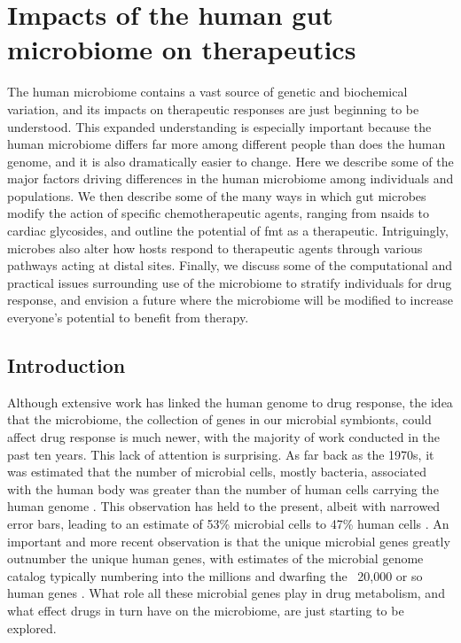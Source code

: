 \glsresetall

\section{Impacts of the human gut microbiome on 
therapeutics}\label{section_review}

The human microbiome contains a vast source of genetic and biochemical variation, and its impacts on therapeutic responses are just beginning to be understood. This expanded understanding is especially important because the human microbiome differs far more among different people than does the human genome, and it is also dramatically easier to change. Here we describe some of the major factors driving differences in the human microbiome among individuals and populations. We then describe some of the many ways in which gut microbes modify the action of specific chemotherapeutic agents, ranging from \glspl{nsaid} to cardiac glycosides, and outline the potential of \gls{fmt} as a therapeutic. Intriguingly, microbes also alter how hosts respond to therapeutic agents through various pathways acting at distal sites. Finally, we discuss some of the computational and practical issues surrounding use of the microbiome to stratify individuals for drug response, and envision a future where the microbiome will be modified to increase everyone's potential to benefit from therapy.

\subsection{Introduction}

Although extensive work has linked the human genome to drug response, the idea that the microbiome, the collection of genes in our microbial symbionts, could affect drug response is much newer, with the majority of work conducted in the past ten years. This lack of attention is surprising. As far back as the 1970s, it was estimated that the number of microbial cells, mostly bacteria, associated with the human body was greater than the number of human cells carrying the human genome \cite{RN4045}. This observation has held to the present, albeit with narrowed error bars, leading to an estimate of 53\% microbial cells to 47\% human cells \cite{RN4039}. An important and more recent observation is that the unique microbial genes greatly outnumber the unique human genes, with estimates of the microbial genome catalog typically numbering into the millions \cite{RN35,RN4030,RN4040} and dwarfing the ~20,000 or so human genes \cite{RN4043}. What role all these microbial genes play in drug metabolism, and what effect drugs in turn have on the microbiome, are just starting to be explored.

